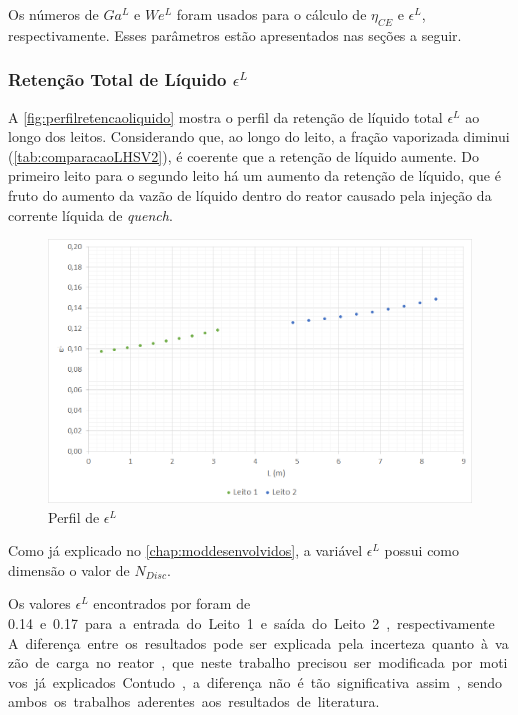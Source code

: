 Os números de $Ga^L$ e $We^L$ foram usados para o cálculo de $\eta_{CE}$ e
$\epsilon^{L}$, respectivamente. Esses parâmetros estão apresentados nas seções
a seguir.

\subsubsection{Retenção Total de Líquido $\epsilon^{L}$}
\label{retencaototaldeliquido}

A \autoref{fig:perfilretencaoliquido} mostra o perfil da retenção de líquido
total $\epsilon^{L}$ ao longo dos leitos. Considerando que, ao longo do leito, a fração vaporizada diminui
(\autoref{tab:comparacaoLHSV2}), é coerente que a retenção de líquido aumente.
Do primeiro leito para o segundo leito há um aumento da retenção de líquido, que
é fruto do aumento da vazão de líquido dentro do reator causado pela injeção da
corrente líquida de \emph{quench}.

\begin{figure}[htb]
\centering
\includegraphics[scale=0.4]{images/Chap4/perfilretencaoliquido.png}
\caption{Perfil de $\epsilon^{L}$}
\label{fig:perfilretencaoliquido}
\end{figure}

Como já explicado no \autoref{chap:moddesenvolvidos}, a variável $\epsilon^{L}$
possui como dimensão o valor de $N_{Disc}$.

Os valores $\epsilon^{L}$ encontrados por  foram de
\SI{0,14} e \SI{0,17} para a entrada do Leito 1 e saída do Leito 2,
respectivamente. A diferença entre os resultados pode ser explicada pela
incerteza quanto à vazão de carga no reator, que neste trabalho precisou ser
modificada por motivos já explicados. Contudo, a diferença não é tão
significativa assim, sendo ambos os trabalhos aderentes aos resultados de
literatura.

